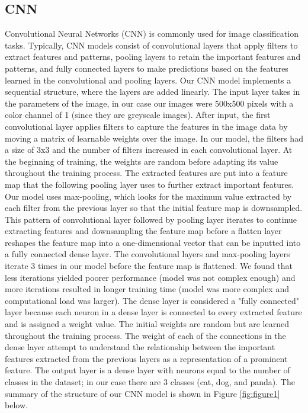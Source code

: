 \subsection{CNN}
Convolutional Neural Networks (CNN) is commonly used for image classification tasks. Typically, CNN models consist of convolutional layers that apply filters to extract features and patterns, pooling layers to retain the important features and patterns, and fully connected layers to make predictions based on the features learned in the convolutional and pooling layers.
Our CNN model implements a sequential structure, where the layers are added linearly. The input layer takes in the parameters of the image, in our case our images were 500x500 pixels with a color channel of 1 (since they are greyscale images). After input, the first convolutional layer applies filters to capture the features in the image data by moving a matrix of learnable weights over the image. In our model, the filters had a size of 3x3 and the number of filters increased in each convolutional layer. At the beginning of training, the weights are random before adapting its value throughout the training process. The extracted features are put into a feature map that the following pooling layer uses to further extract important features. Our model uses max-pooling, which looks for the maximum value extracted by each filter from the previous layer so that the initial feature map is downsampled. This pattern of convolutional layer followed by pooling layer iterates to continue extracting features and downsampling the feature map before a flatten layer reshapes the feature map into a one-dimensional vector that can be inputted into a fully connected dense layer. The convolutional layers and max-pooling layers iterate 3 times in our model before the feature map is flattened. We found that less iterations yielded poorer performance (model was not complex enough) and more iterations resulted in longer training time (model was more complex and computational load was larger). The dense layer is considered a "fully connected" layer because each neuron in a dense layer is connected to every extracted feature and is assigned a weight value. The initial weights are random but are learned throughout the training process. The weight of each of the connections in the dense layer attempt to understand the relationship between the important features extracted from the previous layers as a representation of a prominent feature. The output layer is a dense layer with neurons equal to the number of classes in the dataset; in our case there are 3 classes (cat, dog, and panda). The summary of the structure of our CNN model is shown in Figure \ref{fig:figure1} below.

